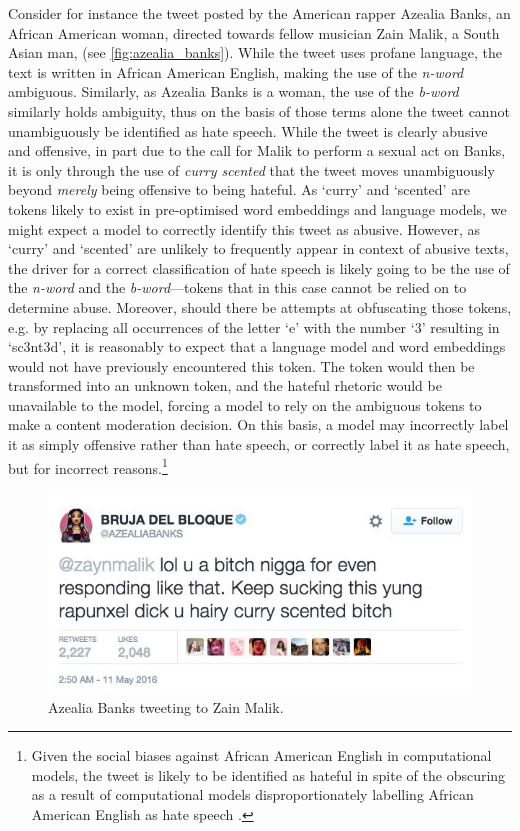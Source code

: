 {Consider for instance the tweet posted by the American rapper Azealia Banks, an African American woman, directed towards fellow musician Zain Malik, a South Asian man, (see \autoref{fig:azealia_banks}).
While the tweet uses profane language, the text is written in African American English, making the use of the \textit{n-word} ambiguous.
Similarly, as Azealia Banks is a woman, the use of the \textit{b-word} similarly holds ambiguity, thus on the basis of those terms alone the tweet cannot unambiguously be identified as hate speech.
While the tweet is clearly abusive and offensive, in part due to the call for Malik to perform a sexual act on Banks, it is only through the use of \textit{curry scented} that the tweet moves unambiguously beyond \textit{merely} being offensive to being hateful.
As `curry' and `scented' are tokens likely to exist in pre-optimised word embeddings and language models, we might expect a model to correctly identify this tweet as abusive.
However, as `curry' and `scented' are unlikely to frequently appear in context of abusive texts, the driver for a correct classification of hate speech is likely going to be the use of the \textit{n-word} and the \textit{b-word}---tokens that in this case cannot be relied on to determine abuse.
Moreover, should there be attempts at obfuscating those tokens, e.g. by replacing all occurrences of the letter `e' with the number `$3$' resulting in `sc3nt3d', it is reasonably to expect that a language model and word embeddings would not have previously encountered this token.
The token would then be transformed into an unknown token, and the hateful rhetoric would be unavailable to the model, forcing a model to rely on the ambiguous tokens to make a content moderation decision.
On this basis, a model may incorrectly label it as simply offensive rather than hate speech, or correctly label it as hate speech, but for incorrect reasons.\footnote{Given the social biases against African American English in computational models, the tweet is likely to be identified as hateful in spite of the obscuring as a result of computational models disproportionately labelling African American English as hate speech \citep{Davidson:2019}.}

\begin{figure}[h]
  \centering
  \includegraphics[scale=0.5]{Azealia_banks.jpeg}
  \caption{Azealia Banks tweeting to Zain Malik.}
  \label{fig:azealia_banks}
\end{figure}

}

